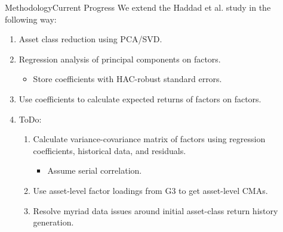 \documentclass[dvipsnames,mathserif, handout]{beamer}
\begin{document}
{\begin{frame}{Methodology}{Current Progress}
	We extend the Haddad et al. study in the following way:
	\begin{enumerate}
		\item Asset class reduction using PCA/SVD. \pause
		\item Regression analysis of principal components on factors. 
		\begin{itemize}
			\item Store coefficients with HAC-robust standard errors. \pause
		\end{itemize}
		\item Use coefficients to calculate expected returns of factors on factors. \pause
		\item ToDo:
		\begin{enumerate}
			\item Calculate variance-covariance matrix of factors using regression coefficients, historical data, and residuals.
			\begin{itemize}
				\item Assume serial correlation. \pause
			\end{itemize}
			\item Use asset-level factor loadings from G3 to get asset-level CMAs. \pause
			\item Resolve myriad data issues around initial asset-class return history generation.
		\end{enumerate}
	\end{enumerate}
\end{frame}

}
\end{document}
